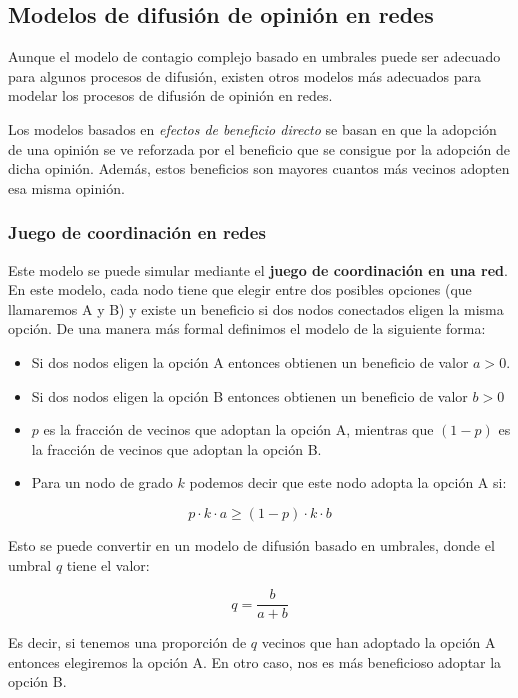 \documentclass[]{article}
\begin{document}
\subsection{Modelos de difusión de opinión en
redes}\label{modelos-de-difusiuxf3n-de-opiniuxf3n-en-redes}

Aunque el modelo de contagio complejo basado en umbrales puede ser
adecuado para algunos procesos de difusión, existen otros modelos más
adecuados para modelar los procesos de difusión de opinión en redes.

Los modelos basados en \emph{efectos de beneficio directo} se basan en
que la adopción de una opinión se ve reforzada por el beneficio que se
consigue por la adopción de dicha opinión. Además, estos beneficios son
mayores cuantos más vecinos adopten esa misma opinión.

\subsubsection{Juego de coordinación en
redes}\label{juego-de-coordinaciuxf3n-en-redes}

Este modelo se puede simular mediante el \textbf{juego de coordinación
en una red}. En este modelo, cada nodo tiene que elegir entre dos
posibles opciones (que llamaremos A y B) y existe un beneficio si dos
nodos conectados eligen la misma opción. De una manera más formal
definimos el modelo de la siguiente forma:

\begin{itemize}
\itemsep1pt\parskip0pt
\item
  Si dos nodos eligen la opción A entonces obtienen un beneficio de
  valor \(a>0\).
\item
  Si dos nodos eligen la opción B entonces obtienen un beneficio de
  valor \(b>0\)
\item
  \(p\) es la fracción de vecinos que adoptan la opción A, mientras que
  \((1-p)\) es la fracción de vecinos que adoptan la opción B.
\item
  Para un nodo de grado \(k\) podemos decir que este nodo adopta la
  opción A si:
\end{itemize}

\[p \cdot k \cdot a \geq (1-p) \cdot k \cdot b\]

Esto se puede convertir en un modelo de difusión basado en umbrales,
donde el umbral \(q\) tiene el valor:

\[q = \frac{b}{a+b}\]

Es decir, si tenemos una proporción de \(q\) vecinos que han adoptado la
opción A entonces elegiremos la opción A. En otro caso, nos es más
beneficioso adoptar la opción B.
\end{document}
